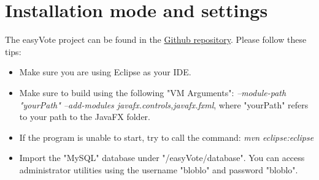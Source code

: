 \documentclass[11pt, oneside]{article}   	%
\begin{document}
\pagebreak


\section{Installation mode and settings}

The easyVote project can be found in the \href{https://github.com/junxiangfederico/easyVote}{Github repository}.
Please follow these tips:
\begin{itemize}
    \item Make sure you are using Eclipse as your IDE.
    \item Make sure to build using the following "VM Arguments": \emph{--module-path "yourPath" --add-modules
javafx.controls,javafx.fxml}, where "yourPath" refers to your path to the JavaFX folder.
    \item If the program is unable to start, try to call the command:
    \emph{mvn eclipse:eclipse}
    \item Import the "MySQL" database under "/easyVote/database". You can access administrator utilities using the username "bloblo" and password "bloblo".
\end{itemize}
\end{document}
